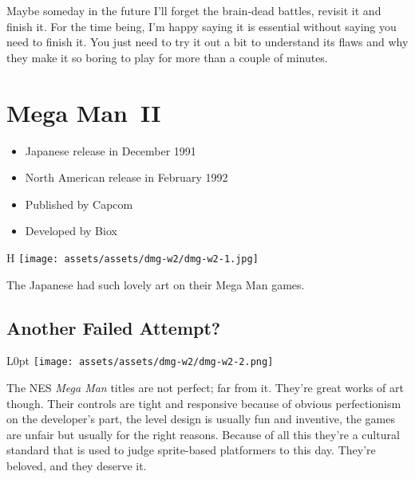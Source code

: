 \documentclass{book}
\begin{document}
Maybe someday in the future I’ll forget the brain-dead battles, revisit it and finish it. For the time being, I’m happy saying it is essential without saying you need to finish it. You just need to try it out a bit to understand its flaws and why they make it so boring to play for more than a couple of minutes.


\begingroup \chapter*{Mega Man II} \endgroup

\begin{itemize} \setlength\itemsep{-0.4em}
\item Japanese release in December 1991
\item North American release in February 1992
\item Published by Capcom
\item Developed by Biox
\end{itemize}\noindent

\begin{wrapfigure}{H}{\linewidth}
\vskip 4pt
\centering \texttt{[image: assets/assets/dmg-w2/dmg-w2-1.jpg]}\par\pagetwodescription The Japanese had such lovely art on their Mega Man games.\end{wrapfigure}
\clearpage

\FloatBarrier\needspace{5pt}\section*{Another Failed Attempt?}\nopagebreak[4]

\begin{wrapfigure}{L}{0pt} \texttt{[image: assets/assets/dmg-w2/dmg-w2-2.png]}\end{wrapfigure}
The NES \emph{Mega Man} titles are not perfect; far from it. They’re great works of art though. Their controls are tight and responsive because of obvious perfectionism on the developer’s part, the level design is usually fun and inventive, the games are unfair but usually for the right reasons. Because of all this they’re a cultural standard that is used to judge sprite-based platformers to this day. They’re beloved, and they deserve it.
\end{document}
